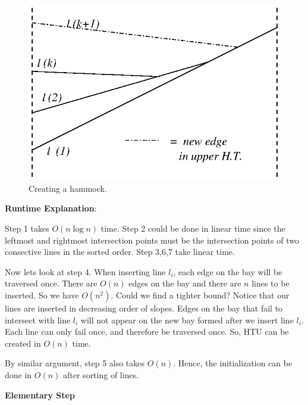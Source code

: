 \documentclass[12pt]{article}
\begin{document}
        \begin{figure}
            \center
            \includegraphics[viewport=265 328 348 390]{initialization.eps}
            \caption{Creating a hammock.}
            \label{figure.init}
        \end{figure}

        \textbf{Runtime Explanation}: 

        Step 1 takes $O(n\log n)$ time. Step 2 could be done in linear time
        since the leftmost and rightmost intersection points must be the 
        intersection points of two consective lines in the sorted order. Step
        3,6,7 take linear time. 

        Now lets look at step 4. When inserting line $l_{i}$, each edge on the
        bay will be traversed once. There are $O(n)$ edges on the bay and
        there are $ n $ lines to be inserted. So we have $O(n^2)$. Could we
        find a tighter bound? Notice that our lines are inserted in decreasing
        order of slopes. Edges on the bay that fail to intersect with line
        $l_{i}$ will not appear on the new bay formed after we insert line
        $l_{i}$. Each line can only fail once, and therefore be traversed once.
        So, HTU can be created in $O(n)$ time.

        By similar argument, step 5 also takes $O(n)$. Hence, the initialization
        can be done in $O(n)$ after sorting of lines.

        \vspace{.2 cm}

        {\bf Elementary Step}
\end{document}
